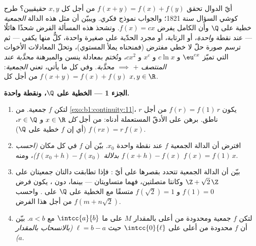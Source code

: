 \begin{problem}[{مسألة نهاية الأسبوع --- $f(x + y) = f(x) + f(y)$:
الانتظام يفرض الخطية، وصورة الوحوش}]
\label{pb:b1:continuity:1}
أيّ الدوال تحقق $f(x + y) = f(x) + f(y)$ من أجل كل $x,
y$ حقيقيين؟ طرح كوشي السؤال سنة 1821؛ والجواب نموذج فكري.
ويبيّن  أن مثل هذه الدالة \emph{الجمعية}
خطية على $\Q$ وأن  الكامل يفرض $f(x)
= cx$. وتشحذ هذه المسألة الفرض شحذًا هائلًا ---
 عند نقطة \emph{واحدة}، أو الرتابة، أو مجرد
الحدّية على  صغيرة واحدة، كلٌّ منها يكفي --- ثم ترسم
صورة حلّ لا خطي مفترض (فمنحناه
يملأ المستوي)، وتحلّ المعادلات الأخوات التي تميّز
$\eu^{cx}$ و $c\ln x$ و $x^c$ و $cx^2$، وتُختم بمعادلة ينسن
والمبرهنة \emph{محدَّبة عند المنتصف $+$ 
$\implies$ محدَّبة}. وفي كل ما يأتي، تعني \emph{الجمعية}:
$f(x + y) = f(x) + f(y)$ من أجل كل $x, y \in \R$.

\medskip
\noindent\textbf{الجزء 1 --- الخطية على $\Q$، ونقطة 
واحدة.}
\begin{enumerate}
  \item لتكن $f$ جمعية. من \cref{exo:b1:continuity:11}،
        يكون $f(r) = f(1)\,r$ من أجل $r$ ناطق. برهن على 
        الأدقّ المستعملة أدناه: من أجل \emph{كل} $x \in \R$ و $r
        \in \Q$، $f(rx) = r\,f(x)$ (أي إن $f$
        خطية على $\Q$).
  \item افترض أن الدالة الجمعية $f$  عند نقطة واحدة
        $x_0$. بيّن أن $f$  في كل مكان
        \emph{(احسب $f(x + h) - f(x)$ بدلالة $f(x_0 + h)
        - f(x_0)$)}، ومنه $f(x) = f(1)\,x$.
  \item بيّن أن الدالة الجمعية تتحدد بقصرها على أيّ
         : فإذا تطابقت دالتان جمعيتان
        على $\Z + \sqrt2\,\Z$ وكانتا متصلتين، فهما
        متساويتان --- بينما، دون ، يكون
        فرض $f(1) = 0$ و $f(\sqrt 2) = 1$ متسقًا
        مع الخطية على $\Q$ على . واحسب $f(m +
        n\sqrt2)$ من أجل هذا الفرض.
  \item لتكن $f$ جمعية ومحدودة من أعلى بالمقدار $M$ على  ما
        $\intcc{a}{b}$ مع $a < b$. بيّن أن $f$
        محدودة من أعلى على $\intcc{0}{\ell}$ حيث $\ell = b - a$
        \emph{(بالانسحاب بالمقدار $a$)}.
\end{enumerate}


\end{problem}
